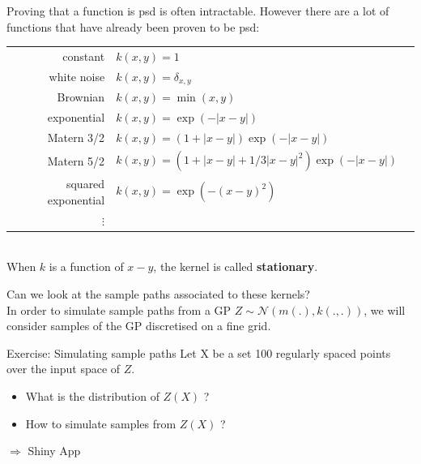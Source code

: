 \begin{frame}{}
Proving that a function is psd is often intractable. However there are a lot of functions that have already been proven to be psd:\\
\vspace{2mm}
\footnotesize
\begin{tabular}{rlN}
		constant & $ \displaystyle k(x,y) = 1 $ &\\[4mm]
		white noise & $ \displaystyle k(x,y) = \delta_{x,y} $ &\\[4mm]
		Brownian & $ \displaystyle k(x,y) =  \min (x,y) $ &\\[4mm]
		exponential & $\displaystyle k(x,y) = \exp \left(- |x-y| \right)$ &\\[4mm]
		Matern 3/2 & $\displaystyle k(x,y) = \left(1 + |x-y| \right) \exp \left(- |x-y| \right)$ &\\[4mm]
		Matern 5/2 & $\displaystyle k(x,y) = \left(1 + |x-y| + 1/3|x-y|^2 \right) \exp \left(- |x-y| \right)$ &\\[4mm]
		squared exponential & $\displaystyle k(x,y) = \exp \left(- (x-y)^2 \right)$ &\\[4mm]
		$\vdots$ &
\end{tabular}\\
\vspace{2mm}
\normalsize
When $k$ is a function of $x-y$, the kernel is called \textbf{stationary}.
\end{frame}

\begin{frame}{}
Can we look at the sample paths associated to these kernels?\\
\vspace{5mm}
In order to simulate sample paths from a GP $Z \sim \mathcal{N}(m(.),k(.,.))$, we will consider samples of the GP discretised on a fine grid.
\vspace{5mm}
\begin{exampleblock}{Exercise: Simulating sample paths}
Let X be a set 100 regularly spaced points over the input space of $Z$.
\begin{itemize}
	\item What is the distribution of $Z(X)$ ?
	\item How to simulate samples from $Z(X)$ ?
\end{itemize}
\end{exampleblock}
\vspace{5mm}
$\Rightarrow$ Shiny App
\end{frame}

